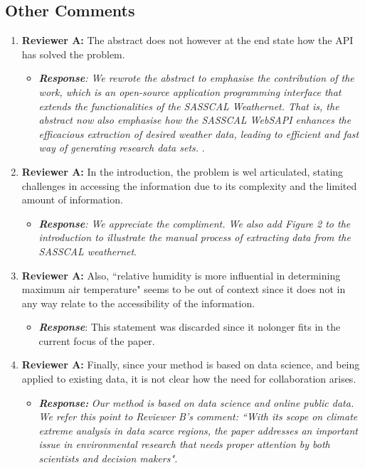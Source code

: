 \documentclass[a4paper, 12pt, conference]{ieeeconf}      %
\begin{document}
	\subsection{Other Comments}
	\begin{enumerate}
		\item \textbf{Reviewer A:} The abstract does not however at the end state how the API has solved the problem.
			\begin{itemize}
			\item \emph{\textbf{Response}: We rewrote the abstract to emphasise the contribution of the work, which is an open-source application programming interface that extends the functionalities of the SASSCAL Weathernet. That is, the abstract now also emphasise how the SASSCAL WebSAPI enhances the efficacious extraction of desired weather data, leading to efficient and fast way of generating research data sets. }.
		\end{itemize}
		
		\item \textbf{Reviewer A:} In the introduction, the problem is wel articulated, stating challenges in accessing the information due to its complexity and the limited amount of information. 
		\begin{itemize}
			\item \emph{\textbf{Response}: We appreciate the compliment. We also add Figure 2 to the introduction to illustrate the manual process of  extracting data from the SASSCAL weathernet}.
		\end{itemize}
	
		\item \textbf{Reviewer A:} Also, ``relative humidity is more influential in determining maximum air temperature" seems to be out of context since it does not in any way relate to the accessibility of the information. 
		\begin{itemize}
		\item \textbf{\emph{Response}}: This statement was discarded since it nolonger fits in the current focus of the paper.
	\end{itemize}

	\item \textbf{Reviewer A:}	Finally, since your method is based on data science, and being applied to existing data, it is not clear how the need for collaboration arises. 
	
	\begin{itemize}
		\item \emph{\textbf{Response:}} \emph{Our method is based on data science and online public data. We refer this point to Reviewer B's comment: ``With its scope on climate extreme analysis in data scarce regions, the paper addresses an important issue in environmental research that needs proper attention by both scientists and decision makers".}
	\end{itemize}
	

\end{enumerate}
\end{document}
